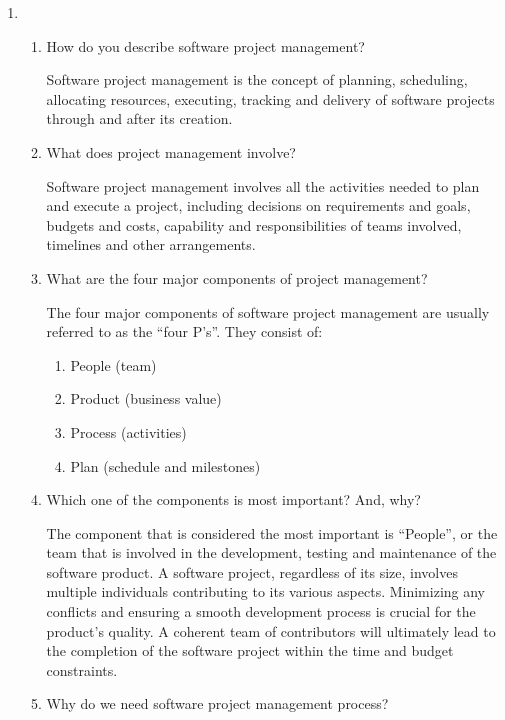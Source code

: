 \documentclass[12pt]{article}
\begin{document}
\begin{enumerate}
\begin{enumerate}[start=1,align=left]
    \end{enumerate}

    \item
    \begin{enumerate}[start=1,align=left]
      \item How do you describe software project management?

      Software project management is the concept of planning, scheduling, allocating resources, executing, tracking and delivery of software projects through and after its creation.

      \item What does project management involve?

      Software project management involves all the activities needed to plan and execute a project, including decisions on requirements and goals, budgets and costs, capability and responsibilities of teams involved, timelines and other arrangements.

      \item What are the four major components of project management?

      The four major components of software project management are usually referred to as the ``four P's''. They consist of:
      \begin{enumerate}
        \item People (team)
        \item Product (business value)
        \item Process (activities)
        \item Plan (schedule and milestones)
      \end{enumerate}

      \item Which one of the components is most important? And, why?

      The component that is considered the most important is ``People'', or the team that is involved in the development, testing and maintenance of the software product. A software project, regardless of its size, involves multiple individuals contributing to its various aspects. Minimizing any conflicts and ensuring a smooth development process is crucial for the product's quality. A coherent team of contributors will ultimately lead to the completion of the software project within the time and budget constraints.

      \item Why do we need software project management process?


\end{enumerate}
\end{enumerate}
\end{document}
